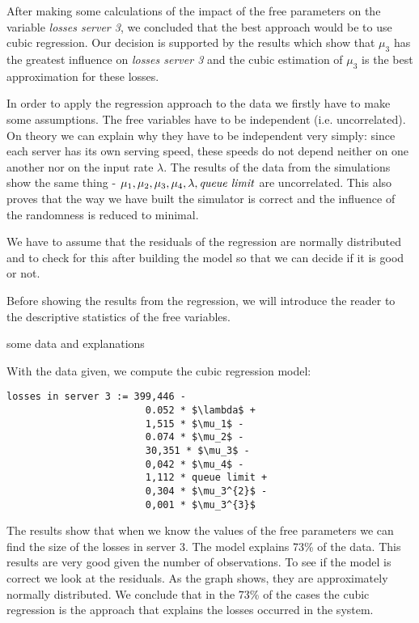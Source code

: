 \documentclass[12pt]{article}
\theoremstyle{plain}
\begin{document}
After making some calculations of the impact of the free parameters on the
variable \emph{losses server 3}, we concluded that the best approach would be
to use cubic regression. Our decision is supported by the results which show
that $\mu_3$ has the greatest influence on \emph{losses server 3} and the cubic
estimation of $\mu_3$ is the best approximation for these losses.

In order to apply the regression approach to the data we firstly have to make
some assumptions. The free variables have to be independent (i.e.
uncorrelated). On theory we can explain why they have to be independent very
simply: since each server has its own serving speed, these speeds do not depend
neither on one another nor on the input rate $\lambda$. The results of the
data from the simulations show the same thing -
$\mu_1, \mu_2, \mu_3, \mu_4, \lambda, \text{\emph{queue limit}}$ are uncorrelated.
This also proves that the way we have built the simulator is correct and the
influence of the randomness is reduced to minimal. 

We have to assume that the residuals of the regression are normally distributed
and to check for this after building the model so that we can decide if it is
good or not.

Before showing the results from the regression, we will introduce the reader to
the descriptive statistics of the free variables.

{\color{red} some data and explanations}

With the data given, we compute the cubic regression model:\\

\begin{lstlisting}[frame=single]
  losses in server 3 := 399,446 -
                        0.052 * $\lambda$ +
                        1,515 * $\mu_1$ -
                        0.074 * $\mu_2$ -
                        30,351 * $\mu_3$ -
                        0,042 * $\mu_4$ -
                        1,112 * queue limit +
                        0,304 * $\mu_3^{2}$ -
                        0,001 * $\mu_3^{3}$
\end{lstlisting}

The results show that when we know the values of the free parameters we can find
the size of the losses in server 3. The model explains 73\% of the data. This
results are very good given the number of observations. To see if the model is
correct we look at the residuals. As the graph shows, they are approximately
normally distributed. We conclude that in the 73\% of the cases the cubic
regression is the approach that explains the losses occurred in the system.
\end{document}

